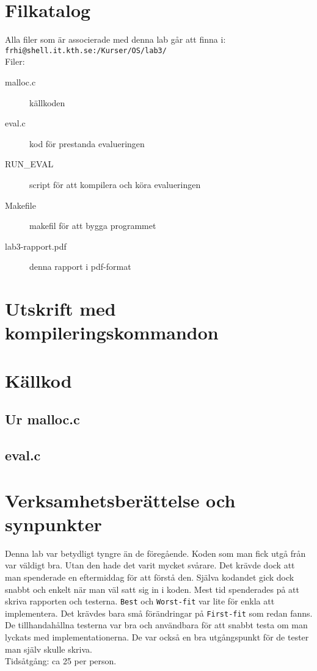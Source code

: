 \documentclass[a4paper]{article}
\begin{document}
\section*{Filkatalog}
Alla filer som är associerade med denna lab går att finna i:\\
\texttt{frhi@shell.it.kth.se:/Kurser/OS/lab3/}
\\
Filer:
\begin{description}
\item[malloc.c] källkoden
\item[eval.c] kod för prestanda evalueringen
\item[RUN\_EVAL] script för att kompilera och köra evalueringen
\item[Makefile] makefil för att bygga programmet
\item[lab3-rapport.pdf] denna rapport i pdf-format
\end{description}

\section*{Utskrift med kompileringskommandon}


\section*{Källkod}
\subsection*{Ur malloc.c}


\subsection*{eval.c}


\section*{Verksamhetsberättelse och synpunkter}
Denna lab var betydligt tyngre än de föregående. Koden som man fick utgå från var väldigt bra. Utan den hade det varit mycket svårare. Det krävde dock att man spenderade en eftermiddag för att förstå den. Själva kodandet gick dock snabbt och enkelt när man väl satt sig in i koden. Mest tid spenderades på att skriva rapporten och testerna. \texttt{Best} och \texttt{Worst-fit} var lite för enkla att implementera. Det krävdes bara små förändringar på \texttt{First-fit} som redan fanns.
\\
De tillhandahållna testerna var bra och användbara för att snabbt testa om man lyckats med implementationerna. De var också en bra utgångspunkt för de tester man själv skulle skriva.
\\
Tidsåtgång: ca 25 per person.
\end{document}
